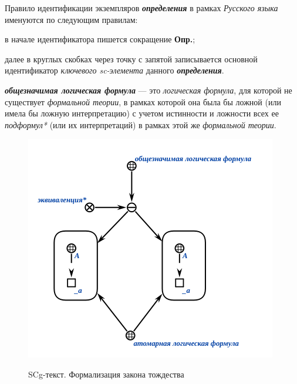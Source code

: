 Правило идентификации экземпляров \textbf{\textit{определения}} в рамках \textit{Русского языка} именуются по следующим правилам:
\begin{textitemize}
	\item{в начале идентификатора пишется сокращение \textbf{Опр.};}
	\item{далее в круглых скобках через точку с запятой записывается основной идентификатор  \textit{ключевого sc-элемента\scnrolesign} данного \textbf{\textit{определения}}.}
\end{textitemize}


\begin{SCn}
\end{SCn}
\textbf{\textit{общезначимая логическая формула}} --- это \textit{логическая формула}, для которой не существует \textit{формальной теории}, в рамках которой она была бы ложной (или имела бы ложную интерпретацию) с учетом истинности и ложности всех ее \textit{подформул*} (или их интерпретаций) в рамках этой же \textit{формальной теории}.

\begin{figure}[H]
\caption{SCg-текст. Формализация закона тождества}
\includegraphics[scale=0.8]{author/part2/figures/logic/valid_formula.png}
\label{fig:valid_formula}
\end{figure}

